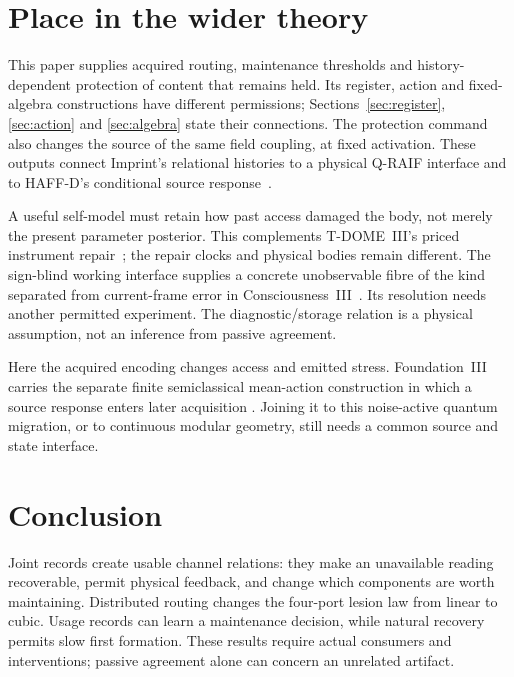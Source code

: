\documentclass[11pt]{article}
\theoremstyle{definition}
\theoremstyle{remark}
\begin{document}
\section{Place in the wider theory}

This paper supplies acquired routing, maintenance thresholds and
history-dependent protection of content that remains held. Its register,
action and fixed-algebra constructions have different permissions;
Sections~\ref{sec:register}, \ref{sec:action} and \ref{sec:algebra} state
their connections. The protection command also changes the source of
the same field coupling, at fixed activation. These outputs connect
Imprint's relational histories to a physical Q-RAIF interface and to
HAFF-D's conditional source response~\cite{HAFFD}.

A useful self-model must retain how past access damaged the body,
not merely the present parameter posterior. This complements
T-DOME~III's priced instrument repair~\cite{TDOMEIII}; the repair
clocks and physical bodies remain different. The sign-blind working
interface supplies a concrete unobservable fibre of the kind separated
from current-frame error in Consciousness~III~\cite{ConsciousnessIII}.
Its resolution needs another permitted experiment. The
diagnostic/storage relation is a physical assumption, not an inference
from passive agreement.

Here the acquired encoding changes access and emitted stress.
Foundation~III carries the separate finite semiclassical mean-action
construction in which a source response enters later acquisition
\cite{FoundationIII}. Joining it to this noise-active quantum migration,
or to continuous modular geometry, still needs a common source and
state interface.

\section{Conclusion}

Joint records create usable channel relations: they make an unavailable reading recoverable, permit physical feedback, and change which components are worth maintaining. Distributed routing changes the four-port lesion law from linear to cubic. Usage records can learn a maintenance decision, while natural recovery permits slow first formation. These results require actual consumers and interventions; passive agreement alone can concern an unrelated artifact.
\end{document}
